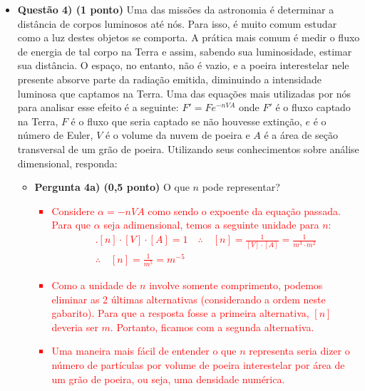 \documentclass[a4paper, 12pt]{article}
\newcommand{\red}[1]{\textcolor{red}{#1}}
\begin{document}
\begin{flushleft}
\begin{itemize}
            \item \textbf{Questão 4) (1 ponto)} Uma das missões da astronomia é determinar a distância de corpos luminosos até nós. Para isso, é muito comum estudar como a luz destes objetos se comporta. A prática mais comum é medir o fluxo de energia de tal corpo na Terra e assim, sabendo sua luminosidade, estimar sua distância. O espaço, no entanto, não é vazio, e a poeira interestelar nele presente absorve parte da radiação emitida, diminuindo a intensidade luminosa que captamos na Terra. Uma das equações mais utilizadas por nós para analisar esse efeito é a seguinte: $F'=F e^{-nVA}$ onde $F'$ é o fluxo captado na Terra, $F$ é o fluxo que seria captado se não houvesse extinção, $e$ é o número de Euler, $V$ é o volume da nuvem de poeira e $A$ é a área de seção transversal de um grão de poeira. Utilizando seus conhecimentos sobre análise dimensional, responda:
                \begin{itemize}
                    \item \textbf{Pergunta 4a) (0,5 ponto)} O que $n$ pode representar?
                        \red{\begin{itemize}
                            \item Considere $\alpha=-nVA$ como sendo o expoente da equação passada. Para que $\alpha$ seja adimensional, temos a seguinte unidade para $n$:
                                \begin{equation*} \begin{gathered}
                                    .[n] \cdot [V] \cdot [A] = 1 \quad \therefore \quad [n]=\frac{1}{[V] \cdot [A]}=\frac{1}{m^3 \cdot m^2} \\
                                    \therefore \quad [n] = \frac{1}{m^5} = m^{-5}
                                \end{gathered} \end{equation*}
                            \item Como a unidade de $n$ involve somente comprimento, podemos eliminar as 2 últimas alternativas (considerando a ordem neste gabarito). Para que a resposta fosse a primeira alternativa, $[n]$ deveria ser $m$. Portanto, ficamos com a segunda alternativa.
                            \item Uma maneira mais fácil de entender o que $n$ representa seria dizer o número de partículas por volume de poeira interestelar por área de um grão de poeira, ou seja, uma densidade numérica.
                        \end{itemize}}

\end{itemize}
\end{itemize}
\end{flushleft}
\end{document}
